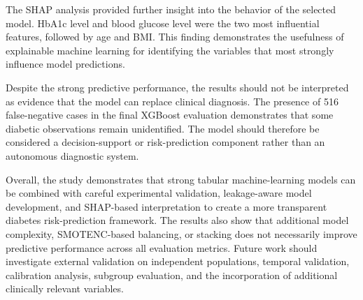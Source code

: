 \documentclass[conference]{IEEEtran}
\begin{document}
The SHAP analysis provided further insight into the behavior of the selected model. HbA1c level and blood glucose level were the two most influential features, followed by age and BMI. This finding demonstrates the usefulness of explainable machine learning for identifying the variables that most strongly influence model predictions.

Despite the strong predictive performance, the results should not be interpreted as evidence that the model can replace clinical diagnosis. The presence of 516 false-negative cases in the final XGBoost evaluation demonstrates that some diabetic observations remain unidentified. The model should therefore be considered a decision-support or risk-prediction component rather than an autonomous diagnostic system.

Overall, the study demonstrates that strong tabular machine-learning models can be combined with careful experimental validation, leakage-aware model development, and SHAP-based interpretation to create a more transparent diabetes risk-prediction framework. The results also show that additional model complexity, SMOTENC-based balancing, or stacking does not necessarily improve predictive performance across all evaluation metrics. Future work should investigate external validation on independent populations, temporal validation, calibration analysis, subgroup evaluation, and the incorporation of additional clinically relevant variables.
\end{document}
